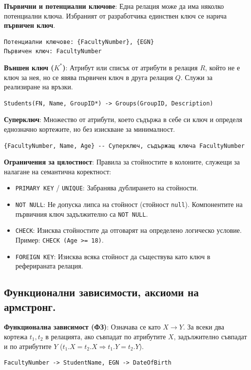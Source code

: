 \documentclass{article}
\renewcommand{\\}{\newline}
\begin{document}
\textbf{Първични и потенциални ключове}: Една релация може да има няколко потенциални ключа. Избраният от разработчика единствен ключ се нарича \textbf{първичен ключ}.
\begin{verbatim}
Потенциални ключове: {FacultyNumber}, {EGN}
Първичен ключ: FacultyNumber
\end{verbatim}

\textbf{Външен ключ ($K^*$)}: Атрибут или списък от атрибути в релация $R$, който не е ключ за нея, но се явява първичен ключ в друга релация $Q$. Служи за реализиране на връзки.
\begin{verbatim}
Students(FN, Name, GroupID*) -> Groups(GroupID, Description)
\end{verbatim}

\textbf{Суперключ}: Множество от атрибути, което съдържа в себе си ключ и определя еднозначно кортежите, но без изискване за минималност.
\begin{verbatim}
{FacultyNumber, Name, Age} -- Суперключ, съдържащ ключа FacultyNumber
\end{verbatim}

\textbf{Ограничения за цялостност}: Правила за стойностите в колоните, служещи за налагане на семантична коректност:
\begin{itemize}
\item \texttt{PRIMARY KEY} / \texttt{UNIQUE}: Забранява дублирането на стойности.
\item \texttt{NOT NULL}: Не допуска липса на стойност (стойност \texttt{null}). Компонентите на първичния ключ задължително са \texttt{NOT NULL}.
\item \texttt{CHECK}: Изисква стойностите да отговарят на определено логическо условие. Пример: \texttt{CHECK (Age >= 18)}.
\item \texttt{FOREIGN KEY}: Изисква всяка стойност да съществува като ключ в реферираната релация.
\end{itemize}

\subsection{Функционални зависимости, аксиоми на армстронг.}

\textbf{Функционална зависимост (ФЗ)}: Означава се като $X \rightarrow Y$. За всеки два кортежа $t_1, t_2$ в релацията, ако съвпадат по атрибутите $X$, задължително съвпадат и по атрибутите $Y$ ($t_1.X = t_2.X \Rightarrow t_1.Y = t_2.Y$).
\begin{verbatim}
FacultyNumber -> StudentName, EGN -> DateOfBirth
\end{verbatim}
\end{document}
